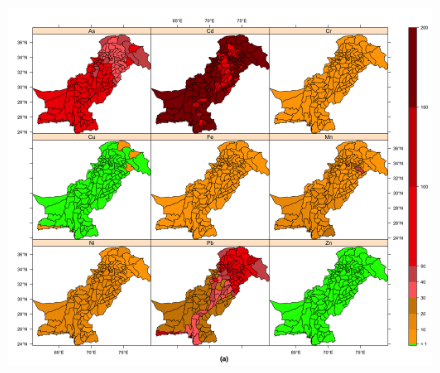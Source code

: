 \newpage

\begin{figure}[hp!]
  \centering
  \includegraphics[width=1.1\textwidth]{Figures/Fig_D_6_a.png}
  \label{Fig_D_6_a}
\end{figure}

\newpage

